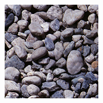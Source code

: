 \begin{figure}[]
\begin{subfigure}{\textwidth}
        \begin{subfigure}{0.19\textwidth}
            \centering
            \includegraphics[width=\textwidth]{images/04-experiment03/staircase_pebble_target.jpg}
        \end{subfigure}
        \hfill
        \begin{subfigure}{0.19\textwidth}
            \centering
\end{subfigure}
\end{subfigure}
\end{figure}
